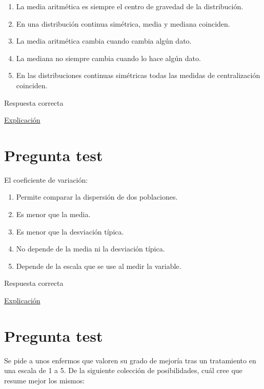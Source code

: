 \documentclass[
]{book}
\providecommand{\tightlist}{%
  \setlength{\itemsep}{0pt}\setlength{\parskip}{0pt}}
\begin{document}
\begin{enumerate}
\def\labelenumi{\alph{enumi})}
\tightlist
\item
  La media aritmética es siempre el centro de gravedad de la distribución.
\item
  En una distribución continua simétrica, media y mediana coinciden.
\item
  La media aritmética cambia cuando cambia algún dato.
\item
  La mediana no siempre cambia cuando lo hace algún dato.
\item
  En las distribuciones continuas simétricas todas las medidas de centralización coinciden.
\end{enumerate}

Respuesta correcta

\href{https://www.statisticshowto.com/what-is-a-bimodal-distribution/}{Explicación}

\hypertarget{pregunta-test-68}{%
\section{Pregunta test}\label{pregunta-test-68}}

El coeficiente de variación:

\begin{enumerate}
\def\labelenumi{\alph{enumi})}
\tightlist
\item
  Permite comparar la dispersión de dos poblaciones.
\item
  Es menor que la media.
\item
  Es menor que la desviación típica.
\item
  No depende de la media ni la desviación típica.
\item
  Depende de la escala que se use al medir la variable.
\end{enumerate}

Respuesta correcta

\href{https://en.wikipedia.org/wiki/Coefficient_of_variation}{Explicación}

\hypertarget{pregunta-test-69}{%
\section{Pregunta test}\label{pregunta-test-69}}

Se pide a unos enfermos que valoren su grado de mejoría tras un tratamiento en una escala de 1 a 5. De la siguiente colección de posibilidades, cuál cree que resume mejor los mismos:
\end{document}
